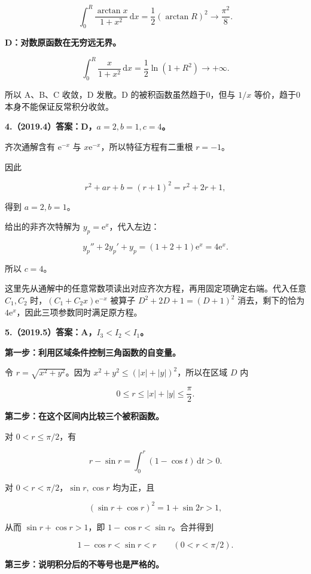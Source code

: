 \documentclass[UTF8,11pt,fontset=windows]{ctexart}
\begin{document}
$$
\int_0^R\frac{\arctan x}{1+x^2}\,\mathrm dx
=\frac12(\arctan R)^2\longrightarrow\frac{\pi^2}{8}.
$$

\textbf{D：对数原函数在无穷远无界。}

$$
\int_0^R\frac{x}{1+x^2}\,\mathrm dx
=\frac12\ln(1+R^2)\longrightarrow+\infty.
$$

所以 A、B、C 收敛，D 发散。D 的被积函数虽然趋于0，但与 $1/x$ 等价，趋于0本身不能保证反常积分收敛。

\clearpage

\textbf{4.（2019.4）答案：D，$a=2,b=1,c=4$。}

齐次通解含有 $\mathrm e^{-x}$ 与 $x\mathrm e^{-x}$，所以特征方程有二重根 $r=-1$。

因此

$$
r^2+ar+b=(r+1)^2=r^2+2r+1,
$$

得到 $a=2,b=1$。

给出的非齐次特解为 $y_p=\mathrm e^x$，代入左边：

$$
y_p''+2y_p'+y_p=(1+2+1)\mathrm e^x=4\mathrm e^x.
$$

所以 $c=4$。

这里先从通解中的任意常数项读出对应齐次方程，再用固定项确定右端。代入任意 $C_1,C_2$ 时，$(C_1+C_2x)\mathrm e^{-x}$ 被算子 $D^2+2D+1=(D+1)^2$ 消去，剩下的恰为 $4\mathrm e^x$，因此三项参数同时满足原方程。

\clearpage

\textbf{5.（2019.5）答案：A，$I_3<I_2<I_1$。}

\textbf{第一步：利用区域条件控制三角函数的自变量。}

令 $r=\sqrt{x^2+y^2}$。因为 $x^2+y^2\le(|x|+|y|)^2$，所以在区域 $D$ 内

$$
0\le r\le|x|+|y|\le\frac\pi2.
$$

\textbf{第二步：在这个区间内比较三个被积函数。}

对 $0<r\le\pi/2$，有

$$
r-\sin r=\int_0^r(1-\cos t)\,\mathrm dt>0.
$$

对 $0<r<\pi/2$，$\sin r,\cos r$ 均为正，且

$$
(\sin r+\cos r)^2=1+\sin2r>1,
$$

从而 $\sin r+\cos r>1$，即 $1-\cos r<\sin r$。合并得到

$$
1-\cos r<\sin r<r\qquad(0<r<\pi/2).
$$

\textbf{第三步：说明积分后的不等号也是严格的。}
\end{document}
